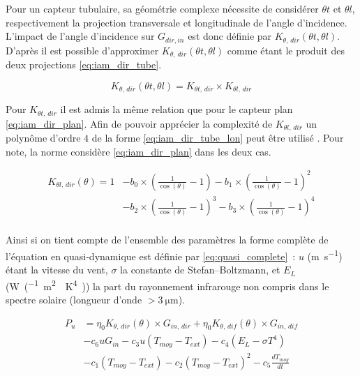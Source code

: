 Pour un capteur tubulaire, sa géométrie complexe nécessite de considérer $\theta t$ et
$\theta l$, respectivement la projection transversale et longitudinale de l’angle
d’incidence. L’impact de l’angle d’incidence sur $G_{dir, in}$ est donc définie par
$K_{\theta,\,dir} (\theta t, \theta l)$. D’après \textcite{McIntire1982315} il est possible
d’approximer $K_{\theta,\,dir} (\theta t, \theta l)$ comme étant le produit des deux
projections \eqref{eq:iam_dir_tube}.

\begin{equation}\label{eq:iam_dir_tube}
    K_{\theta,\,dir} (\theta t, \theta l) = K_{\theta t,\,dir} \times K_{\theta l,\,dir}
\end{equation}

Pour $K_{\theta t,\,dir}$ il est admis la même relation que pour le capteur plan \eqref{eq:iam_dir_plan}.
Afin de pouvoir apprécier la complexité de $K_{\theta l,\,dir}$ un polynôme d’ordre
$4$ de la forme \eqref{eq:iam_dir_tube_lon} peut être utilisé \parencite{Zambolin201237}.
Pour note, la norme considère \eqref{eq:iam_dir_plan} dans les deux cas.

\begin{align}\label{eq:iam_dir_tube_lon}
    K_{\theta l,\,dir} (\theta) = 1 &- b_{0} \times \left(\frac{1}{\cos(\theta)} - 1\right)
                          - b_{1} \times \left(\frac{1}{\cos(\theta)} - 1\right)^{2} \\
                          &- b_{2} \times \left(\frac{1}{\cos(\theta)} - 1\right)^{3}
                          - b_{3} \times \left(\frac{1}{\cos(\theta)} - 1\right)^{4} \\
\end{align}

Ainsi si on tient compte de l’ensemble des paramètres la forme complète de l’équation
en quasi-dynamique est définie par \eqref{eq:quasi_complete}~: $u$ (\si{\metre\per\second})
étant la vitesse du vent, $\sigma$ la constante de Stefan–Boltzmann, et $E_{L}$
(\si{W\per(\metre\squared\period\kelvin^{4})}) la part du rayonnement infrarouge
non compris dans le spectre solaire (longueur d’onde $> \SI{3}{\micro\metre}$).


\begin{align}\label{eq:quasi_complete}
        P_{u}  &= \eta_{0} K_{\theta,\,dir}(\theta) \times G_{in,\,dir} +
                  \eta_{0} K_{\theta,\,dif}(\theta) \times G_{in,\,dif} \\
                &- c_{6}uG_{in} - c_{3} u(T_{moy} - T_{ext}) - c_{4} (E_{L} - \sigma T^{4}) \\
                &- c_{1} (T_{moy} - T_{ext}) - c_{2} (T_{moy} - T_{ext})^{2} - c_{5}\frac{dT_{moy}}{dt}
\end{align}


